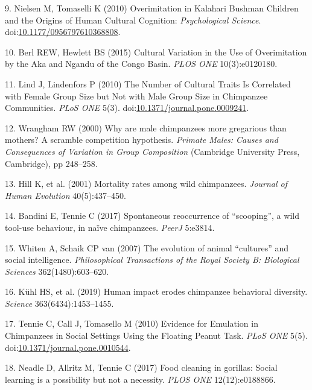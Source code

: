 \documentclass[9pt,twocolumn,twoside,]{pnas-new}
\begin{document}
\hypertarget{ref-nielsen_overimitation_2010}{}
9. Nielsen M, Tomaselli K (2010) Overimitation in Kalahari Bushman
Children and the Origins of Human Cultural Cognition:
\emph{Psychological Science}.
doi:\href{https://doi.org/10.1177/0956797610368808}{10.1177/0956797610368808}.

\hypertarget{ref-berl_cultural_2015}{}
10. Berl REW, Hewlett BS (2015) Cultural Variation in the Use of
Overimitation by the Aka and Ngandu of the Congo Basin. \emph{PLOS ONE}
10(3):e0120180.

\hypertarget{ref-lind_number_2010}{}
11. Lind J, Lindenfors P (2010) The Number of Cultural Traits Is
Correlated with Female Group Size but Not with Male Group Size in
Chimpanzee Communities. \emph{PLoS ONE} 5(3).
doi:\href{https://doi.org/10.1371/journal.pone.0009241}{10.1371/journal.pone.0009241}.

\hypertarget{ref-wrangham_why_2000}{}
12. Wrangham RW (2000) Why are male chimpanzees more gregarious than
mothers? A scramble competition hypothesis. \emph{Primate Males: Causes
and Consequences of Variation in Group Composition} (Cambridge
University Press, Cambridge), pp 248--258.

\hypertarget{ref-hill_mortality_2001}{}
13. Hill K, et al. (2001) Mortality rates among wild chimpanzees.
\emph{Journal of Human Evolution} 40(5):437--450.

\hypertarget{ref-bandini_spontaneous_2017}{}
14. Bandini E, Tennie C (2017) Spontaneous reoccurrence of ``scooping'',
a wild tool-use behaviour, in naïve chimpanzees. \emph{PeerJ} 5:e3814.

\hypertarget{ref-whiten_evolution_2007}{}
15. Whiten A, Schaik CP van (2007) The evolution of animal ``cultures''
and social intelligence. \emph{Philosophical Transactions of the Royal
Society B: Biological Sciences} 362(1480):603--620.

\hypertarget{ref-kuhl_human_2019}{}
16. Kühl HS, et al. (2019) Human impact erodes chimpanzee behavioral
diversity. \emph{Science} 363(6434):1453--1455.

\hypertarget{ref-tennie_evidence_2010}{}
17. Tennie C, Call J, Tomasello M (2010) Evidence for Emulation in
Chimpanzees in Social Settings Using the Floating Peanut Task.
\emph{PLoS ONE} 5(5).
doi:\href{https://doi.org/10.1371/journal.pone.0010544}{10.1371/journal.pone.0010544}.

\hypertarget{ref-neadle_food_2017}{}
18. Neadle D, Allritz M, Tennie C (2017) Food cleaning in gorillas:
Social learning is a possibility but not a necessity. \emph{PLOS ONE}
12(12):e0188866.
\end{document}
